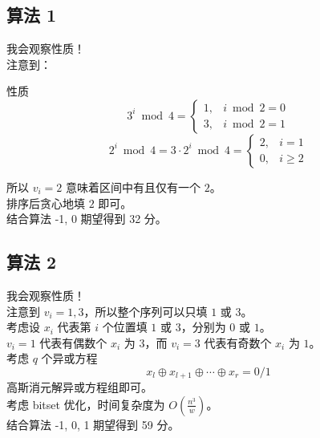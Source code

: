 \documentclass[11pt, fontset = fandol]{ctexbeamer}
\begin{document}
\subsection{算法 1}
\begin{frame}
  \pause
  我会观察性质！\\
  \pause
  注意到：\\
  \pause
  \begin{block}{性质}
    $$
    3^i \bmod 4 =
    \begin{cases}
      1, &i \bmod 2 = 0\\
      3, &i \bmod 2 = 1
    \end{cases}
    $$
    $$
    2^i \bmod 4 = 3 \cdot 2^i \bmod 4 =
    \begin{cases}
      2, &i = 1\\
      0, &i \ge 2
    \end{cases}
    $$
  \end{block}
  所以 $v_i = 2$ 意味着区间中有且仅有一个 $2$。\\
  排序后贪心地填 $2$ 即可。\\
  \pause
  结合算法 -1, 0 期望得到 32 分。
\end{frame}

\subsection{算法 2}
\begin{frame}
  \pause
  我会观察性质！\\
  \pause
  注意到 $v_i = 1, 3$，所以整个序列可以只填 $1$ 或 $3$。\\
  \pause
  考虑设 $x_i$ 代表第 $i$ 个位置填 $1$ 或 $3$，分别为 $0$ 或 $1$。\\
  \pause
  $v_i=1$ 代表有偶数个 $x_i$ 为 $3$，而 $v_i = 3$ 代表有奇数个 $x_i$ 为 $1$。\\
  \pause
  考虑 $q$ 个异或方程
  $$
  x_l \oplus x_{l+1} \oplus \cdots \oplus x_r = 0 / 1
  $$
  高斯消元解异或方程组即可。\\
  \pause
  考虑 bitset 优化，时间复杂度为 $O(\frac{n^3}{w})$。\\
  结合算法 -1, 0, 1 期望得到 59 分。
\end{frame}
\end{document}
